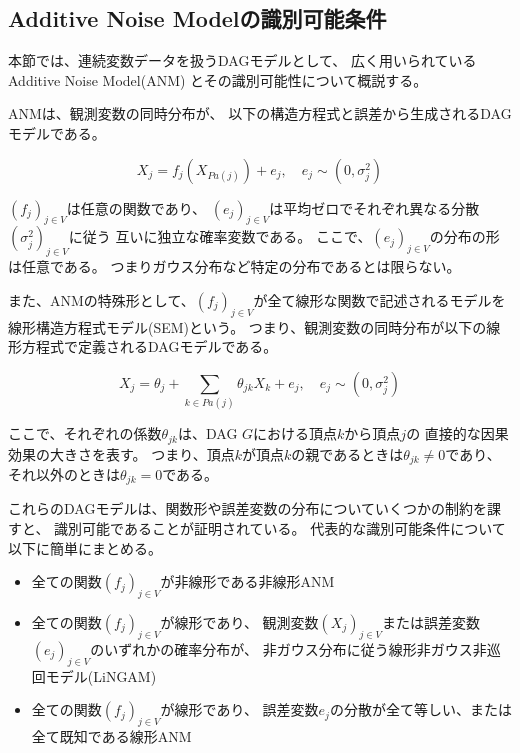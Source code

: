 
\subsection{Additive Noise Modelの識別可能条件}

本節では、連続変数データを扱うDAGモデルとして、
広く用いられているAdditive Noise Model(ANM)
\cite{Shimizu2006-yu}
\cite{Hoyer2008-oo}
\cite{Peters2013-eb}
\cite{Peters2014-ro}
\cite{Park2020-ey}
とその識別可能性について概説する。

ANMは、観測変数の同時分布が、
以下の構造方程式と誤差から生成されるDAGモデルである。

\begin{equation}
  X_j = f_j(X_{Pa(j)}) + e_j , \quad e_j \sim (0, \sigma_j^2)
  \label{def:ANM}
\end{equation}

$(f_j)_{j\in V}$は任意の関数であり、
$(e_j)_{j\in V}$は平均ゼロでそれぞれ異なる分散$(\sigma_j^2)_{j\in V}$に従う
互いに独立な確率変数である。
ここで、$(e_j)_{j\in V}$の分布の形は任意である。
つまりガウス分布など特定の分布であるとは限らない。

また、ANMの特殊形として、$(f_j)_{j\in V}$が全て線形な関数で記述されるモデルを
線形構造方程式モデル(SEM)という。
つまり、観測変数の同時分布が以下の線形方程式で定義されるDAGモデルである。

\begin{equation}
  X_j = \theta_j + \sum_{k \in Pa(j)} \theta_{jk} X_k + e_j, \quad e_j \sim (0, \sigma_j^2)
\end{equation}

ここで、それぞれの係数$\theta_{jk}$は、DAG $G$における頂点$k$から頂点$j$の
直接的な因果効果の大きさを表す。
つまり、頂点$k$が頂点$k$の親であるときは$\theta_{jk} \neq 0$であり、
それ以外のときは$\theta_{jk}=0$である。

これらのDAGモデルは、関数形や誤差変数の分布についていくつかの制約を課すと、
識別可能であることが証明されている。
代表的な識別可能条件について以下に簡単にまとめる。

\begin{itemize}
  \item
  全ての関数$(f_j)_{j \in V}$が非線形である非線形ANM\cite{Hoyer2008-oo}

  \item
  全ての関数$(f_j)_{j \in V}$が線形であり、
  観測変数$(X_j)_{j \in V}$または誤差変数$(e_j)_{j\in V}$のいずれかの確率分布が、
  非ガウス分布に従う線形非ガウス非巡回モデル(LiNGAM)\cite{Shimizu2006-yu}

  \item
  全ての関数$(f_j)_{j \in V}$が線形であり、
  誤差変数$e_j$の分散が全て等しい、または全て既知である線形ANM\cite{Peters2013-eb}
\end{itemize}

